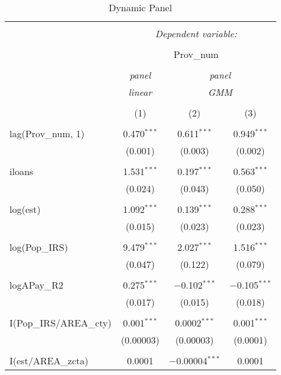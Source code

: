 
\begin{table}[!htbp] \centering 
  \caption{Dynamic Panel} 
  \label{} 
\begin{tabular}{@{\extracolsep{5pt}}lccc} 
\\[-1.8ex]\hline 
\hline \\[-1.8ex] 
 & \multicolumn{3}{c}{\textit{Dependent variable:}} \\ 
\cline{2-4} 
\\[-1.8ex] & \multicolumn{3}{c}{Prov\_num} \\ 
\\[-1.8ex] & \textit{panel} & \multicolumn{2}{c}{\textit{panel}} \\ 
 & \textit{linear} & \multicolumn{2}{c}{\textit{GMM}} \\ 
\\[-1.8ex] & (1) & (2) & (3)\\ 
\hline \\[-1.8ex] 
 lag(Prov\_num, 1) & 0.470$^{***}$ & 0.611$^{***}$ & 0.949$^{***}$ \\ 
  & (0.001) & (0.003) & (0.002) \\ 
  & & & \\ 
 iloans & 1.531$^{***}$ & 0.197$^{***}$ & 0.563$^{***}$ \\ 
  & (0.024) & (0.043) & (0.050) \\ 
  & & & \\ 
 log(est) & 1.092$^{***}$ & 0.139$^{***}$ & 0.288$^{***}$ \\ 
  & (0.015) & (0.023) & (0.023) \\ 
  & & & \\ 
 log(Pop\_IRS) & 9.479$^{***}$ & 2.027$^{***}$ & 1.516$^{***}$ \\ 
  & (0.047) & (0.122) & (0.079) \\ 
  & & & \\ 
 logAPay\_R2 & 0.275$^{***}$ & $-$0.102$^{***}$ & $-$0.105$^{***}$ \\ 
  & (0.017) & (0.015) & (0.018) \\ 
  & & & \\ 
 I(Pop\_IRS/AREA\_cty) & 0.001$^{***}$ & 0.0002$^{***}$ & 0.001$^{***}$ \\ 
  & (0.00003) & (0.00003) & (0.0001) \\ 
  & & & \\ 
 I(est/AREA\_zcta) & 0.0001 & $-$0.00004$^{***}$ & 0.0001 \\ 

\end{tabular}
\end{table}
